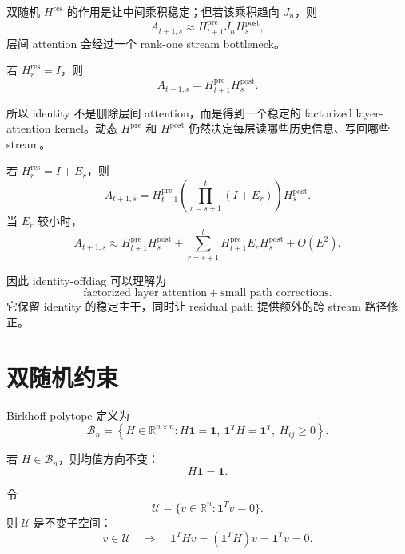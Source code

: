 \documentclass[UTF8,11pt]{ctexart}
\newcommand{\R}{\mathbb{R}}
\newcommand{\one}{\mathbf{1}}
\newcommand{\Birkhoff}{\mathcal{B}_n}
\newcommand{\J}{J_n}
\newcommand{\Hres}{H^{\mathrm{res}}}
\newcommand{\Hpre}{H^{\mathrm{pre}}}
\newcommand{\Hpost}{H^{\mathrm{post}}}
\begin{document}
双随机 $\Hres$ 的作用是让中间乘积稳定；但若该乘积趋向 $\J$，则
\begin{equation}
  A_{t+1,s}
  \approx
  H_{t+1}^{\mathrm{pre}}\J H_s^{\mathrm{post}},
\end{equation}
层间 attention 会经过一个 rank-one stream bottleneck。

若 $H_r^{\mathrm{res}}=I$，则
\begin{equation}
  A_{t+1,s}
  =
  H_{t+1}^{\mathrm{pre}}H_s^{\mathrm{post}}.
\end{equation}

所以 identity 不是删除层间 attention，而是得到一个稳定的 factorized layer-attention kernel。动态 $\Hpre$ 和 $\Hpost$ 仍然决定每层读哪些历史信息、写回哪些 stream。

若 $H_r^{\mathrm{res}}=I+E_r$，则
\begin{equation}
  A_{t+1,s}
  =
  H_{t+1}^{\mathrm{pre}}
  \left(\prod_{r=s+1}^{t}(I+E_r)\right)
  H_s^{\mathrm{post}}.
\end{equation}
当 $E_r$ 较小时，
\begin{equation}
  A_{t+1,s}
  \approx
  H_{t+1}^{\mathrm{pre}}H_s^{\mathrm{post}}
  +
  \sum_{r=s+1}^{t}
  H_{t+1}^{\mathrm{pre}}E_rH_s^{\mathrm{post}}
  +O(E^2).
\end{equation}

因此 identity-offdiag 可以理解为
\begin{equation}
  \text{factorized layer attention}
  +
  \text{small path corrections}.
\end{equation}
它保留 identity 的稳定主干，同时让 residual path 提供额外的跨 stream 路径修正。

\section{双随机约束}

Birkhoff polytope 定义为
\begin{equation}
  \Birkhoff
  =
  \left\{
  H\in\R^{n\times n}: H\one=\one,\ \one^T H=\one^T,\ H_{ij}\ge 0
  \right\}.
\end{equation}

若 $H\in\Birkhoff$，则均值方向不变：
\begin{equation}
  H\one=\one.
\end{equation}

令
\begin{equation}
  \mathcal{U}=\{v\in\R^n:\one^T v=0\}.
\end{equation}
则 $\mathcal{U}$ 是不变子空间：
\begin{equation}
  v\in\mathcal{U}
  \quad\Rightarrow\quad
  \one^T Hv=(\one^T H)v=\one^T v=0.
\end{equation}
\end{document}
